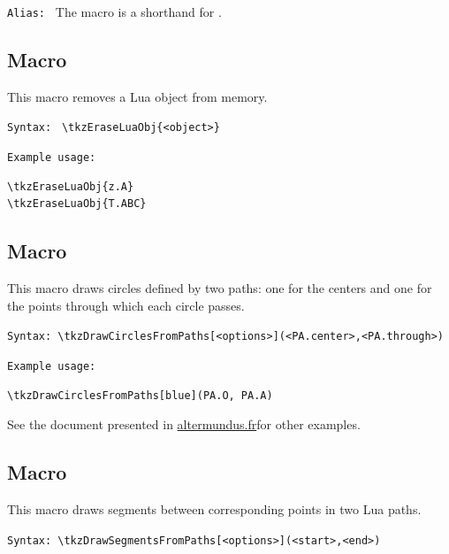 \texttt{Alias: } The macro  is a shorthand for .

\subsection{Macro }
\label{sub:macro_tkzEraseLuaObj}

This macro removes a Lua object from memory.


\texttt{Syntax: } \verb|\tkzEraseLuaObj{<object>}|



\texttt{Example usage: }

\begin{mybox}
\begin{verbatim}
\tkzEraseLuaObj{z.A}
\tkzEraseLuaObj{T.ABC}
\end{verbatim}
\end{mybox}

\subsection{Macro }
\label{sub:macro_tkzDrawCirclesFromPaths}
This macro draws circles defined by two paths: one for the centers and one for the points through which each circle passes.

\texttt{Syntax: }\verb|\tkzDrawCirclesFromPaths[<options>](<PA.center>,<PA.through>)|

\texttt{Example usage: }

\begin{mybox}
\begin{verbatim}
\tkzDrawCirclesFromPaths[blue](PA.O, PA.A)
\end{verbatim}
\end{mybox}

See the document  presented in \href{http://altermundus.fr}{altermundus.fr}for other examples.

\subsection{Macro }
\label{sub:macro_tkzDrawSegmentsFromPaths}

This macro draws segments between corresponding points in two Lua paths.


\texttt{Syntax: }\verb|\tkzDrawSegmentsFromPaths[<options>](<start>,<end>)|

